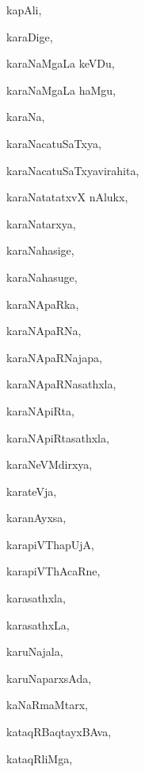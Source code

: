 \begin{multicols}{3}
{\noindent
{kapAli}, \pageref{kapAli}

\noindent
{karaDige}, \pageref{karaDige}

\noindent
{karaNaMgaLa keVDu}, \pageref{karaNaMgaLa keVDu}

\noindent
{karaNaMgaLa haMgu}, \pageref{karaNaMgaLa haMgu}

\noindent
{karaNa}, \pageref{karaNa}

\noindent
{karaNacatuSaTxya}, \pageref{karaNacatuSaTxya}

\noindent
{karaNacatuSaTxyavirahita}, \pageref{karaNacatuSaTxyavirahita}

\noindent
{karaNatatatxvX nAlukx}, \pageref{karaNatatatxvX nAlukx}

\noindent
{karaNatarxya}, \pageref{karaNatarxya}

\noindent
{karaNahasige}, \pageref{karaNahasige}

\noindent
{karaNahasuge}, \pageref{karaNahasuge}

\noindent
{karaNApaRka}, \pageref{karaNApaRka}

\noindent
{karaNApaRNa}, \pageref{karaNApaRNa}

\noindent
{karaNApaRNajapa}, \pageref{karaNApaRNajapa}

\noindent
{karaNApaRNasathxla}, \pageref{karaNApaRNasathxla}

\noindent
{karaNApiRta}, \pageref{karaNApiRta}

\noindent
{karaNApiRtasathxla}, \pageref{karaNApiRtasathxla}

\noindent
{karaNeVMdirxya}, \pageref{karaNeVMdirxya}

\noindent
{karateVja}, \pageref{karateVja}

\noindent
{karanAyxsa}, \pageref{karanAyxsa}

\noindent
{karapiVThapUjA}, \pageref{karapiVThapUjA}

\noindent
{karapiVThAcaRne}, \pageref{karapiVThAcaRne}

\noindent
{karasathxla}, \pageref{karasathxla}

\noindent
{karasathxLa}, \pageref{karasathxLa}

\noindent
{karuNajala}, \pageref{karuNajala}

\noindent
{karuNaparxsAda}, \pageref{karuNaparxsAda}

\noindent
{kaNaRmaMtarx}, \pageref{kaNaRmaMtarx}

\noindent
{kataqRBaqtayxBAva}, \pageref{kataqRBaqtayxBAva}

\noindent
{kataqRliMga}, \pageref{kataqRliMga}

}
\end{multicols}
